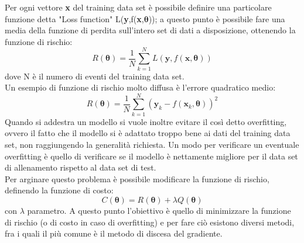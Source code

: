 Per ogni vettore \textbf{x} del training data set è possibile definire una particolare funzione detta "Loss function" L(\textbf{y},f(\textbf{x},$\bm{\theta}$)); a questo punto è possibile fare una media della funzione di perdita sull'intero set di dati a disposizione, ottenendo la funzione di rischio: \\
\begin{equation}
R(\bm{\theta}) = \frac{1}{N}\sum_{k=1}^{N}L(\textbf{y},f(\textbf{x},\bm{\theta}))
\end{equation}
dove N è il numero di eventi del training data set. \\
Un esempio di funzione di rischio molto diffusa è l'errore quadratico medio:
\begin{equation}
R(\bm{\theta}) = \frac{1}{N}\sum_{k=1}^{N}(\textbf{y}_k - f(\textbf{x}_k , \bm{\theta}))^2
\end{equation}
Quando si addestra un modello si vuole inoltre evitare il così detto overfitting, ovvero il fatto che il modello si è adattato troppo bene ai dati del training data set, non raggiungendo la generalità richiesta. Un modo per verificare un eventuale overfitting è quello di verificare se il modello è nettamente migliore per il data set di allenamento rispetto al data set di test. \\
Per arginare questo problema è possibile modificare la funzione di rischio, definendo la funzione di costo:
\begin{equation}
C(\bm{\theta}) = R(\bm{\theta}) + \lambda Q(\bm{\theta})
\end{equation}
con $\lambda$ parametro.
A questo punto l'obiettivo è quello di minimizzare la funzione di rischio (o di costo in caso di overfitting) e per fare ciò esistono diversi metodi, fra i quali il più comune è il metodo di discesa del gradiente.


